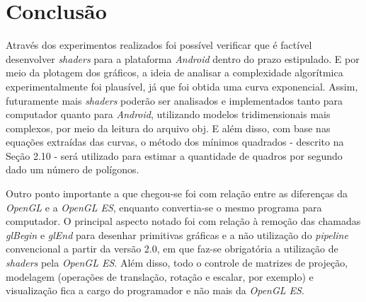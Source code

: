 \section{Conclusão}

	Através dos experimentos realizados foi possível verificar que é factível desenvolver \textit{shaders} para a plataforma \textit{Android} dentro do prazo estipulado. E por meio da plotagem dos gráficos, a ideia de analisar a complexidade algorítmica experimentalmente foi plausível, já que foi obtida uma curva exponencial. Assim, futuramente mais \textit{shaders} poderão ser analisados e implementados tanto para computador quanto para \textit{Android}, utilizando modelos tridimensionais mais complexos, por meio da leitura do arquivo obj. E além disso, com base nas equações extraídas das curvas, o método dos mínimos quadrados - descrito na Seção 2.10 - será utilizado para estimar a  quantidade de quadros por segundo dado um número de polígonos. 
	
	Outro ponto importante a que chegou-se foi com relação entre as diferenças da  \textit{OpenGL} e a  \textit{OpenGL ES}, enquanto convertia-se o mesmo programa para computador.   O principal aspecto notado foi com relação à remoção das chamadas \textit{glBegin} e \textit{glEnd} para desenhar primitivas gráficas e a não utilização do \textit{pipeline} convencional a partir da versão 2.0, em que faz-se obrigatória a utilização de \textit{shaders} pela \textit{OpenGL ES}. Além disso, todo o controle de matrizes de projeção, modelagem (operações de translação, rotação e escalar, por exemplo) e visualização fica a cargo do programador e não mais da \textit{OpenGL ES}. 




